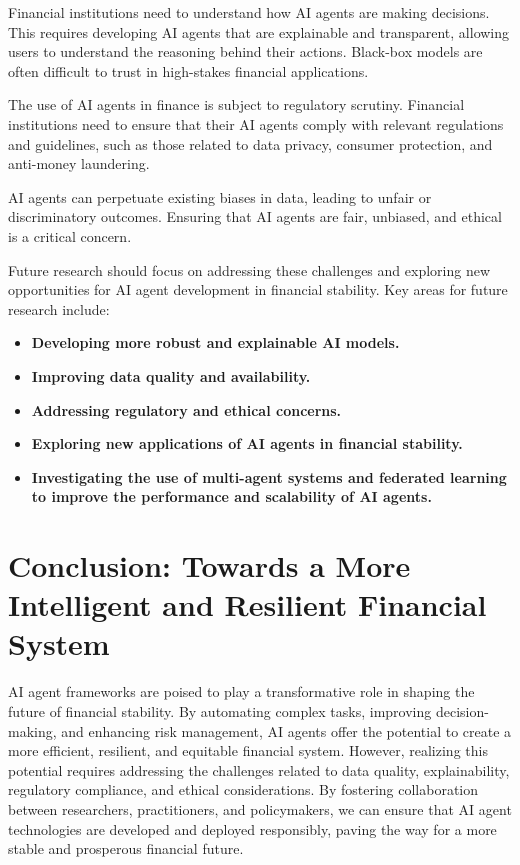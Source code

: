 \documentclass[a4paper,headinclude=on,footinclude=on,12pt,oneside]{scrbook}
\begin{document}

Financial institutions need to understand how AI agents are making decisions. This requires developing AI agents that are explainable and transparent, allowing users to understand the reasoning behind their actions. Black-box models are often difficult to trust in high-stakes financial applications.


The use of AI agents in finance is subject to regulatory scrutiny. Financial institutions need to ensure that their AI agents comply with relevant regulations and guidelines, such as those related to data privacy, consumer protection, and anti-money laundering.


AI agents can perpetuate existing biases in data, leading to unfair or discriminatory outcomes. Ensuring that AI agents are fair, unbiased, and ethical is a critical concern.


Future research should focus on addressing these challenges and exploring new opportunities for AI agent development in financial stability. Key areas for future research include:

\begin{itemize}
\item \textbf{Developing more robust and explainable AI models.}
\item \textbf{Improving data quality and availability.}
\item \textbf{Addressing regulatory and ethical concerns.}
\item \textbf{Exploring new applications of AI agents in financial stability.}
\item \textbf{Investigating the use of multi-agent systems and federated learning to improve the performance and scalability of AI agents.}
\end{itemize}

\section*{Conclusion: Towards a More Intelligent and Resilient Financial System}

AI agent frameworks are poised to play a transformative role in shaping the future of financial stability. By automating complex tasks, improving decision-making, and enhancing risk management, AI agents offer the potential to create a more efficient, resilient, and equitable financial system. However, realizing this potential requires addressing the challenges related to data quality, explainability, regulatory compliance, and ethical considerations. By fostering collaboration between researchers, practitioners, and policymakers, we can ensure that AI agent technologies are developed and deployed responsibly, paving the way for a more stable and prosperous financial future.
\end{document}
